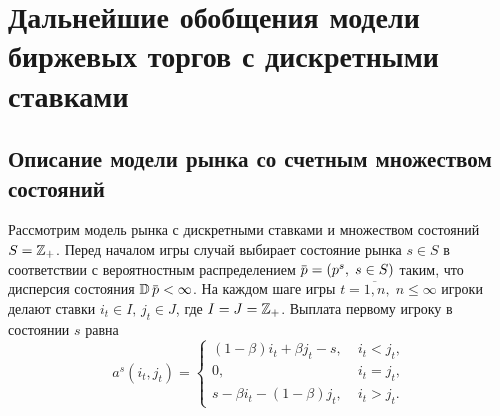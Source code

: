 \chapter{Дальнейшие обобщения модели биржевых торгов с дискретными ставками} \label{chapt3}
{

\newcommand{\as}[1][\beta]{\ensuremath{a^{s,#1}}}
\newcommand{\s}{\ensuremath{s}}
\newcommand{\q}{\ensuremath{\overbar{q}}}
\newcommand{\theG}[1][n]{\ensuremath{G^\beta_{#1}}}
\newcommand{\K}[1][n]{\ensuremath{K^\beta_{#1}}}
\newcommand{\V}[1][n]{\ensuremath{V^\beta_{#1}}}
\newcommand{\High}[1][\ensuremath{\infty}]{\ensuremath{H^\beta_{#1}}}
\newcommand{\sigmav}{\ensuremath{\overbar{\sigma}}}
\newcommand{\tauv}{\ensuremath{\overbar{\tau}}}
\newcommand{\xiv}{\ensuremath{\overbar{\xi}}}
\newcommand{\sigmak}{\ensuremath{\hat{\sigma}}}
\newcommand{\Low}[1][\ensuremath{\infty}]{\ensuremath{L^\beta_{#1}}}

\section{Описание модели рынка со счетным множеством состояний}
\label{ch3:sec:model-descr}

Рассмотрим модель рынка с дискретными ставками и множеством состояний $S = \mathbb{Z}_+$.
Перед началом игры случай выбирает состояние рынка $\s \in S$ в соответствии с вероятностным распределением $\p = (p^s, \; s \in S)$ таким, что дисперсия состояния $\D \p < \infty$.
На каждом шаге игры $t = \overline{1,n}, \; n \leqslant \infty$ игроки делают ставки $i_t \in I, \, j_t \in J$, где $I = J = \mathbb{Z}_+$.
Выплата первому игроку в состоянии $s$ равна
\begin{equation*}
  a^s(i_t, j_t) =
  \begin{cases}
    (1-\beta) i_t + \beta j_t - s, &\; i_t < j_t, \\
    0, &\; i_t = j_t, \\
    s - \beta i_t - (1-\beta)j_t, &\; i_t > j_t.
  \end{cases}
\end{equation*}

}

